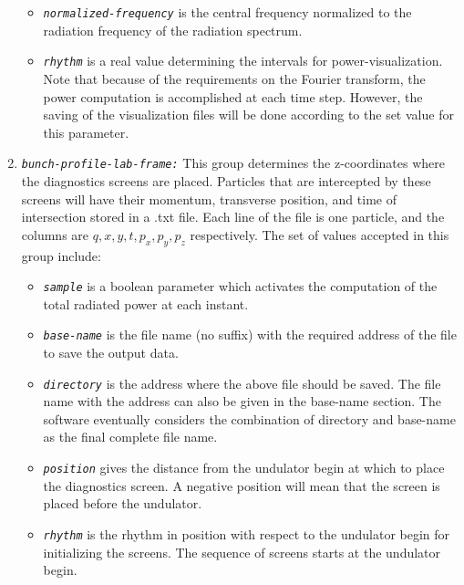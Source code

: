 \begin{enumerate}
\begin{itemize}
	\item {\tt \small \em normalized-frequency} is the central frequency normalized to the radiation frequency of the radiation spectrum.
	\item {\tt \small \em rhythm} is a real value determining the intervals for power-visualization. Note that because of the requirements on the Fourier transform, the power computation is accomplished at each time step. However, the saving of the visualization files will be done according to the set value for this parameter.
\end{itemize}
%
\item {\tt \small \em bunch-profile-lab-frame:} This group determines the z-coordinates where the diagnostics screens are placed. Particles that are intercepted by these screens will have their momentum, transverse position, and time of intersection stored in a .txt file. Each line of the file is one particle, and the columns are $q, x, y, t, p_x, p_y, p_z$ respectively.
%
The set of values accepted in this group include:
%
\begin{itemize}
	\item {\tt \small \em sample} is a boolean parameter which activates the computation of the total radiated power at each instant.
	\item {\tt \small \em base-name} is the file name (no suffix) with the required address of the file to save the output data.
	\item {\tt \small \em directory} is the address where the above file should be saved. The file name with the address can also be given in the base-name section. The software eventually considers the combination of directory and base-name as the final complete file name.
	\item {\tt \small \em position} gives the distance from the undulator begin at which to place the diagnostics screen. A negative position will mean that the screen is placed before the undulator.
	\item {\tt \small \em rhythm} is the rhythm in position with respect to the undulator begin for initializing the screens. The sequence of screens starts at the undulator begin.
\end{itemize}
%
\end{enumerate}

